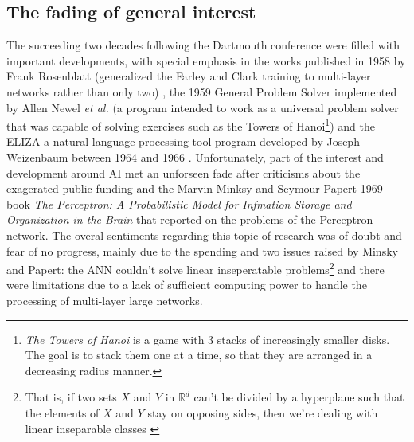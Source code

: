 \documentclass[a4paper, 12pt]{report}
\begin{document}
\subsection{The fading of general interest}
\par The succeeding two decades following the Dartmouth conference were filled with important developments, with special emphasis in the works published in 1958 by Frank Rosenblatt (generalized the Farley and Clark training to multi-layer networks rather than only two) \autocite{rosenblattPerceptronProbabilisticModel1958}, the 1959 General Problem Solver implemented by Allen Newel \textit{et al.} (a program intended to work as a universal problem solver that was capable of solving exercises such as the Towers of Hanoi\footnote{\textit{The Towers of Hanoi} is a game with 3 stacks of increasingly smaller disks. The goal is to stack them one at a time, so that they are arranged in a decreasing radius manner.}) \autocite{newell1959report} and the ELIZA a natural language processing tool program developed by Joseph Weizenbaum between 1964 and 1966 \autocite{weizenbaumELIZAComputerProgram1966}. Unfortunately, part of the interest and development around AI met an unforseen fade after criticisms about the exagerated public funding \autocite{haenleinBriefHistoryArtificial2019} and the Marvin Minksy and Seymour Papert 1969 book \textit{The Perceptron: A Probabilistic Model for Infmation Storage and Organization in the Brain} \autocite{minsky69perceptrons} that reported on the problems of the Perceptron network. The overal sentiments regarding this topic of research was of doubt and fear of no progress, mainly due to the spending and two issues raised by Minsky and Papert: the ANN couldn't solve linear inseperatable problems\footnote{That is, if two sets $X$ and $Y$ in $\mathbb{R}^d$ can't be divided by a hyperplane such that the elements of $X$ and $Y$ stay on opposing sides, then we're dealing with linear inseparable classes \autocite{elizondoLinearSeparabilityProblem2006}} and there were limitations due to a lack of sufficient computing power to handle the processing of multi-layer large networks.
\end{document}
